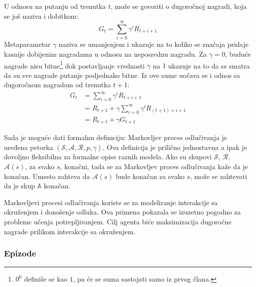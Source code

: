 U odnosu na putanju od trenutka $t$, može se govoriti o dugoročnoj nagradi, koja se još naziva i dobitkom:
\begin{equation}
\label{eq:dug_suma}
	G_t = \sum_{i=0}^{\infty} \gamma^iR_{t+i+1}
\end{equation}
Metaparametar $\gamma$ naziva se umanjenjem i ukazuje na to koliko se značaja pridaje kasnije dobijenim nagradama u odnosu na neposrednu nagradu. Za $\gamma = 0$, buduće nagrade nisu bitne\footnote{$0^0$ definiše se kao $1$, pa će se suma sastojati samo iz prvog člana.} dok postavljanje vrednosti $\gamma$ na $1$ ukazuje na to da se smatra da su sve nagrade putanje podjednako bitne. Iz ove sume uočava se i odnos sa dugoročnom nagradom od trenutka $t+1$:
\begin{equation}
	\begin{aligned}
		G_t &= \sum_{i=0}^{\infty} \gamma^iR_{t+i+1} \\
        	&= R_{t+1} + \gamma\sum_{i=0}^{\infty} \gamma^iR_{(t+1)+i+1} \\
        	&=R_{t+1} + \gamma G_{t+1}
	\end{aligned}
\end{equation}
\par 
Sada je moguće dati formalnu definiciju: Markovljev proces odlučivanja je uređena petorka $(\mathcal{S}, \mathcal{A}, \mathcal{R}, p, \gamma)$. Ova definicija je prilično jednostavna a ipak je dovoljno fleksibilna za formalne opise raznih modela. Ako su skupovi $\mathcal{S}$, $\mathcal{R}$, $\mathcal{A}(s)$, za svako $s$, konačni, tada se za Markovljev proces odlučivanja kaže da je konačan. Umesto zahteva da $\mathcal{A}(s)$ bude konačan za svako $s$, može se zahtevati da je skup $\mathbb{A}$ konačan.
\par 
Markovljevi procesi odlučivanja koriste se za modeliranje interakcije sa okruženjem i donošenje odluka. Ova primena pokazala se izuzetno pogodno za probleme učenja potrepljivanjem. Cilj agenta biće maksimizacija dugoročne nagrade prilikom interakcije sa okruženjem.


\subsubsection{Epizode}


